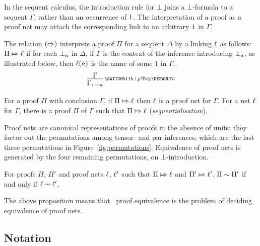 \documentclass[conference]{IEEEtran}
\begin{document}
\noindent
In the sequent calculus, the introduction rule for $\bot$ joins a $\bot$-formula to a sequent $\Gamma$, rather than an occurrence of $1$.
%
The interpretation of a proof as a proof net may attach the corresponding link to an arbitrary $1$ in $\Gamma$.


\begin{definition}
\label{def:proofs to nets}
%
The relation $(\Mapsto)$ interprets a proof $\Pi$ for a sequent $\Delta$ by a linking $\ell$ as follows:
% 
$\Pi\Mapsto\ell$ if for each $\bot_{a}$ in $\Delta$, if $\Gamma$ is the context of the inference introducing $\bot_{a}$, as illustrated below, then $\ell(a)$ is the name of some $1$ in $\Gamma$.
\[
	\infer[\MLLlabel b]{\Gamma,\named a\bot}{\Gamma}
\]
%
\end{definition}



\begin{proposition}[\cite{DR89}]
\label{prop:correctness and sequentialisation}
%
For a proof $\Pi$ with conclusion $\Gamma$, if $\Pi\Mapsto\ell$ then $\ell$ is a proof net for $\Gamma$.
%
For a net $\ell$ for $\Gamma$, there is a proof $\Pi$ of $\Gamma$ such that $\Pi\Mapsto\ell$ (\emph{sequentialisation}).
%
\end{proposition}


\noindent
Proof nets are canonical representations of proofs in the absence of units: they factor out the permutations among tensor- and par-inferences, which are the last three permutations in Figure~\ref{fig:permutations}.
%
Equivalence of proof nets is generated by the four remaining permutations, on $\bot$-introduction.



\begin{proposition}[\cite{HughesMLLProofNets}] %
\label{prop:proof nets work}
%
For proofs $\Pi$, $\Pi'$ and proof nets $\ell$, $\ell'$ such that $\Pi\Mapsto\ell$ and $\Pi'\Mapsto\ell'$, $\Pi\perm\Pi'$ if and only if $\links\perm\links'$.
%
\end{proposition}


\noindent
The above proposition means that \MLL\ proof equivalence is the problem of deciding equivalence of proof nets.




\subsection*{Notation}
\end{document}
